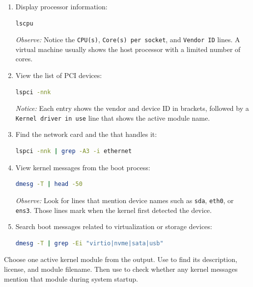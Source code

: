 \begin{enumerate}
    \item Display processor information:
\begin{lstlisting}[language=bash, caption={Reading processor specifications}]
lscpu
\end{lstlisting}
    \textit{Observe:} Notice the \texttt{CPU(s)}, \texttt{Core(s) per socket}, and \texttt{Vendor ID} lines. A virtual machine usually shows the host processor with a limited number of cores.

    \item View the list of PCI devices:
\begin{lstlisting}[language=bash, caption={PCI device list with active drivers}]
lspci -nnk
\end{lstlisting}
    \textit{Notice:} Each entry shows the vendor and device ID in brackets, followed by a \texttt{Kernel driver in use} line that shows the active  module name.

    \item Find the network card and the  that handles it:
\begin{lstlisting}[language=bash, caption={Filtering network card information}]
lspci -nnk | grep -A3 -i ethernet
\end{lstlisting}

    \item View kernel messages from the boot process:
\begin{lstlisting}[language=bash, caption={Kernel messages during boot}]
dmesg -T | head -50
\end{lstlisting}
    \textit{Observe:} Look for lines that mention device names such as \texttt{sda}, \texttt{eth0}, or \texttt{ens3}. Those lines mark when the kernel first detected the device.

    \item Search boot messages related to virtualization or storage devices:
\begin{lstlisting}[language=bash, caption={Filtering kernel messages with dmesg}]
dmesg -T | grep -Ei "virtio|nvme|sata|usb"
\end{lstlisting}
\end{enumerate}

\begin{challengebox}
Choose one active kernel module from the  output. Use  to find its description, license, and module filename. Then use  to check whether any kernel messages mention that module during system startup.
\end{challengebox}

